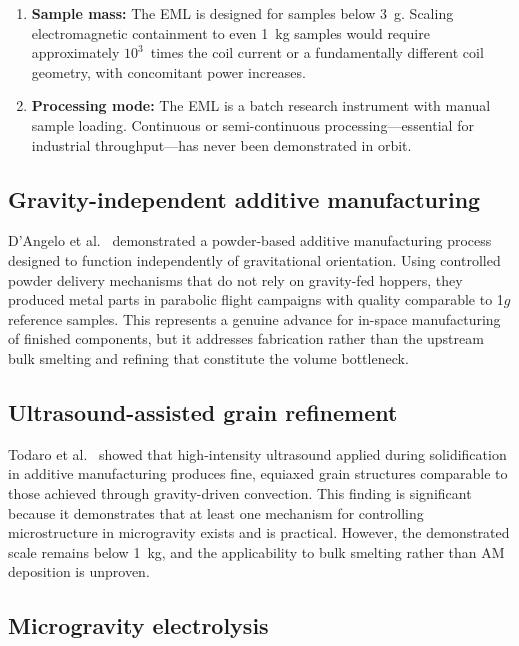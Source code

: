 \documentclass[preprint,12pt]{elsarticle}
\begin{document}
\begin{enumerate}
    \item \textbf{Sample mass:} The EML is designed for samples below 3~g. Scaling electromagnetic containment to even 1~kg samples would require approximately $10^3$~times the coil current or a fundamentally different coil geometry, with concomitant power increases.
    \item \textbf{Processing mode:} The EML is a batch research instrument with manual sample loading. Continuous or semi-continuous processing---essential for industrial throughput---has never been demonstrated in orbit.
\end{enumerate}

\subsection{Gravity-independent additive manufacturing}

D'Angelo et al.\ \cite{dangelo2021} demonstrated a powder-based additive manufacturing process designed to function independently of gravitational orientation. Using controlled powder delivery mechanisms that do not rely on gravity-fed hoppers, they produced metal parts in parabolic flight campaigns with quality comparable to 1$g$ reference samples. This represents a genuine advance for in-space manufacturing of finished components, but it addresses fabrication rather than the upstream bulk smelting and refining that constitute the volume bottleneck.

\subsection{Ultrasound-assisted grain refinement}

Todaro et al.\ \cite{todaro2020} showed that high-intensity ultrasound applied during solidification in additive manufacturing produces fine, equiaxed grain structures comparable to those achieved through gravity-driven convection. This finding is significant because it demonstrates that at least one mechanism for controlling microstructure in microgravity exists and is practical. However, the demonstrated scale remains below 1~kg, and the applicability to bulk smelting rather than AM deposition is unproven.

\subsection{Microgravity electrolysis}
\end{document}
